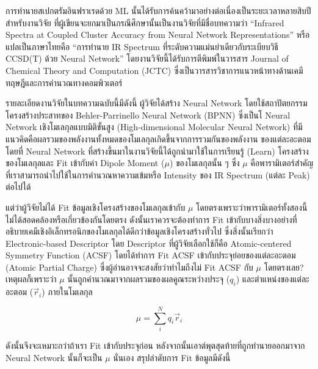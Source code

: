 การทำนายสเปกตรัมอินฟราเรดด้วย ML นั้นได้รับการค้นคว้ามาอย่างต่อเนื่องเป็นระยะเวลาหลายสิบปี\autocite{gastegger2017} สำหรับงานวิจัย%
ที่ผู้เขียนจะยกมาเป็นกรณีศึกษานั้นเป็นงานวิจัยที่มีชื่อบทความว่า \enquote{Infrared Spectra at Coupled Cluster Accuracy from Neural 
Network Representations} หรือแปลเป็นภาษาไทยคือ \enquote{การทำนาย IR Spectrum ที่ระดับความแม่นยำเดียวกับระเบียบวิธี CCSD(T) 
ด้วย Neural Network}\autocite{beckmann2022} โดยงานวิจัยนี้ได้รับการตีพิมพ์ในวารสาร Journal of Chemical Theory and Computation 
(JCTC) ซึ่งเป็นวารสารวิชาการแนวหน้าทางด้านเคมีทฤษฎีและการคำนวณทางคอมพิวเตอร์ 

รายละเอียดงานวิจัยในบทความฉบับนี้มีดังนี้ ผู้วิจัยได้สร้าง Neural Network โดยใช้สถาปัตยกรรมโครงสร้างประสาทของ Behler-Parrinello 
Neural Network (BPNN)\autocite{behler2007,behler2011b,behler2015} ซึ่งเป็นโ Neural Network เชิงโมเลกุลแบบมิติขั้นสูง 
(High-dimensional Molecular Neural Network) ที่มีแนวคิดคือผลรวมของพลังงานทั้งหมดของโมเลกุลเกิดขึ้นจากการรวมกันของพลังงาน%
ของแต่ละอะตอม โดยที่ Neural Network ที่สร้างขึ้นมาในงานวิจัยนี้ได้ถูกนำมาใช้ในการเรียนรู้ (Learn) โครงสร้างของโมเลกุลและ Fit เข้ากับค่า 
Dipole Moment ($\mu$) ของโมเลกุลนั้น ๆ ซึ่ง $\mu$ คือพารามิเตอร์สำคัญที่เราสามารถนำไปใช้ในการคำนวณหาความเข้มหรือ Intensity 
ของ IR Spectrum (แต่ละ Peak) ต่อไปได้

แต่ว่าผู้วิจัยไม่ได้ Fit ข้อมูลเชิงโครงสร้างของโมเลกุลเข้ากับ $\mu$ โดยตรงเพราะว่าพารามิเตอร์ทั้งสองนี้ไม่ได้สอดคล้องหรือเกี่ยวข้องกันโดยตรง 
ดังนั้นเราควรจะต้องทำการ Fit เข้ากับบางสิ่งบางอย่างที่อธิบายเคมีเชิงอิเล็กทรอนิกของโมเลกุลได้ดีกว่าข้อมูลเชิงโครงสร้างทั่วไป ซึ่งสิ่งนั้นเรียกว่า 
Electronic-based Descriptor โดย Descriptor ที่ผู้วิจัยเลือกใช้ก็คือ Atomic-centered Symmetry Function (ACSF) โดยได้ทำการ 
Fit ACSF เข้ากับประจุย่อยของแต่ละอะตอม (Atomic Partial Charge) ซึ่งผู้อ่านอาจจะสงสัยว่าทำไมถึงไม่ Fit ACSF กับ $\mu$ โดยตรงเลย? 
เหตุผลก็เพราะว่า $\mu$ นั้นถูกคำนวณมาจากผลรวมของผลคูณระหว่างประจุ ($q_{i}$) และตำแหน่งของแต่ละอะตอม ($\vec{r}_{i}$) 
ภายในโมเลกุล

\begin{equation}
    \mu = \sum^{N}_{i} q_{i}\vec{r}_{i}
\end{equation}

\noindent ดังนั้นจึงจะเหมาะกว่าถ้าเรา Fit เข้ากับประจุก่อน หลังจากนั้นเอาต์พุตสุดท้ายที่ถูกทำนายออกมาจาก Neural Network นั้นก็จะเป็น 
$\mu$ นั่นเอง สรุปลำดับการ Fit ข้อมูลมีดังนี้ 


